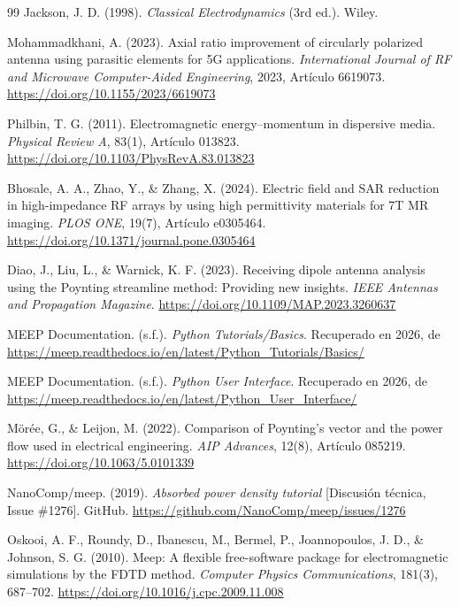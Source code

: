 \begin{thebibliography}{99}
Jackson, J. D. (1998). \textit{Classical Electrodynamics} (3rd ed.). Wiley.

Mohammadkhani, A. (2023). Axial ratio improvement of circularly polarized antenna using parasitic elements for 5G applications. \textit{International Journal of RF and Microwave Computer-Aided Engineering}, 2023, Artículo 6619073. \url{https://doi.org/10.1155/2023/6619073}

Philbin, T. G. (2011). Electromagnetic energy–momentum in dispersive media. \textit{Physical Review A}, 83(1), Artículo 013823. \url{https://doi.org/10.1103/PhysRevA.83.013823}

Bhosale, A. A., Zhao, Y., \& Zhang, X. (2024). Electric field and SAR reduction in high-impedance RF arrays by using high permittivity materials for 7T MR imaging. \textit{PLOS ONE}, 19(7), Artículo e0305464. \url{https://doi.org/10.1371/journal.pone.0305464}

Diao, J., Liu, L., \& Warnick, K. F. (2023). Receiving dipole antenna analysis using the Poynting streamline method: Providing new insights. \textit{IEEE Antennas and Propagation Magazine}. \url{https://doi.org/10.1109/MAP.2023.3260637}

MEEP Documentation. (s.f.). \textit{Python Tutorials/Basics}. Recuperado en 2026, de \url{https://meep.readthedocs.io/en/latest/Python_Tutorials/Basics/}

MEEP Documentation. (s.f.). \textit{Python User Interface}. Recuperado en 2026, de \url{https://meep.readthedocs.io/en/latest/Python_User_Interface/}

Mörée, G., \& Leijon, M. (2022). Comparison of Poynting's vector and the power flow used in electrical engineering. \textit{AIP Advances}, 12(8), Artículo 085219. \url{https://doi.org/10.1063/5.0101339}

NanoComp/meep. (2019). \textit{Absorbed power density tutorial} [Discusión técnica, Issue \#1276]. GitHub. \url{https://github.com/NanoComp/meep/issues/1276}

Oskooi, A. F., Roundy, D., Ibanescu, M., Bermel, P., Joannopoulos, J. D., \& Johnson, S. G. (2010). Meep: A flexible free-software package for electromagnetic simulations by the FDTD method. \textit{Computer Physics Communications}, 181(3), 687--702. \url{https://doi.org/10.1016/j.cpc.2009.11.008}


\end{thebibliography}
